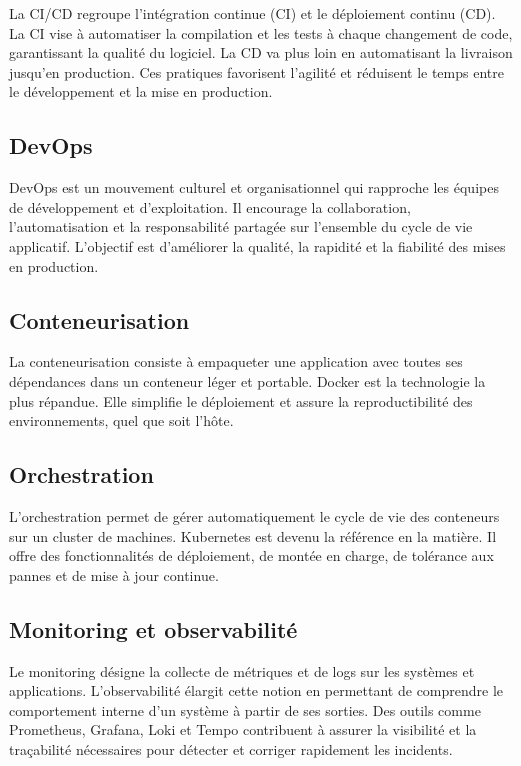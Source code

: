 La CI/CD regroupe l’intégration continue (CI) et le déploiement continu (CD). La CI vise à automatiser la compilation et les tests à chaque changement de code, garantissant la qualité du logiciel. La CD va plus loin en automatisant la livraison jusqu’en production. Ces pratiques favorisent l’agilité et réduisent le temps entre le développement et la mise en production.

\subsection{DevOps}

DevOps est un mouvement culturel et organisationnel qui rapproche les équipes de développement et d’exploitation. Il encourage la collaboration, l’automatisation et la responsabilité partagée sur l’ensemble du cycle de vie applicatif. L’objectif est d’améliorer la qualité, la rapidité et la fiabilité des mises en production.

\subsection{Conteneurisation}

La conteneurisation consiste à empaqueter une application avec toutes ses dépendances dans un conteneur léger et portable. Docker est la technologie la plus répandue. Elle simplifie le déploiement et assure la reproductibilité des environnements, quel que soit l’hôte.

\subsection{Orchestration}

L’orchestration permet de gérer automatiquement le cycle de vie des conteneurs sur un cluster de machines. Kubernetes est devenu la référence en la matière. Il offre des fonctionnalités de déploiement, de montée en charge, de tolérance aux pannes et de mise à jour continue.

\subsection{Monitoring et observabilité}

Le monitoring désigne la collecte de métriques et de logs sur les systèmes et applications. L’observabilité élargit cette notion en permettant de comprendre le comportement interne d’un système à partir de ses sorties. Des outils comme Prometheus, Grafana, Loki et Tempo contribuent à assurer la visibilité et la traçabilité nécessaires pour détecter et corriger rapidement les incidents.

